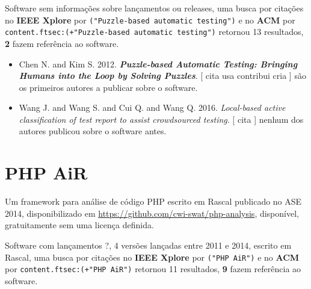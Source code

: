 Software sem informações sobre lançamentos ou releases,
uma busca por citações no {\bf IEEE Xplore} por
\texttt{("Puzzle-based automatic testing")}
e no {\bf ACM} por
\texttt{content.ftsec:(+"Puzzle-based automatic testing")}
retornou
13 resultados,
{\bf 2} fazem referência ao software.

\begin{itemize}
\item Chen N. and Kim S.
      2012.
        \textbf{\textit{ Puzzle-based Automatic Testing: Bringing Humans into the Loop by Solving Puzzles}}.
      [
          cita
          usa
          contribui
          cria
      ]
são os primeiros autores a publicar sobre o software.
\item Wang J. and Wang S. and Cui Q. and Wang Q.
      2016.
        \textit{ Local-based active classification of test report to assist crowdsourced testing}.
      [
          cita
      ]
nenhum dos autores publicou sobre o software antes.
\end{itemize}
\section{PHP AiR}

Um framework para análise de código PHP escrito em Rascal
publicado no ASE 2014,
disponibilizado em \url{https://github.com/cwi-swat/php-analysis},
disponível,
gratuitamente
sem uma licença definida.

Software com lançamentos ?,
4 versões lançadas
entre 2011 e 2014,
escrito em Rascal,
uma busca por citações no {\bf IEEE Xplore} por
\texttt{("PHP AiR")}
e no {\bf ACM} por
\texttt{content.ftsec:(+"PHP AiR")}
retornou
11 resultados,
{\bf 9} fazem referência ao software.

